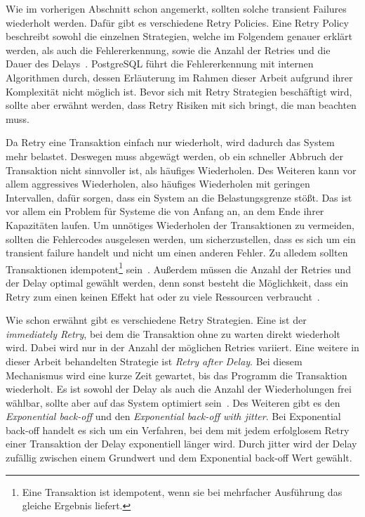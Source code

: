 
Wie im vorherigen Abschnitt schon angemerkt, sollten solche transient Failures wiederholt werden.
Dafür gibt es verschiedene Retry Policies.
Eine Retry Policy beschreibt sowohl die einzelnen Strategien, welche im Folgendem genauer erklärt werden, als auch
die Fehlererkennung, sowie die Anzahl der Retries und die Dauer des Delays~\cite{MicrosoftTransientFaults}.
PostgreSQL führt die Fehlererkennung mit internen Algorithmen durch, dessen Erläuterung im Rahmen dieser Arbeit
aufgrund ihrer Komplexität nicht möglich ist.
Bevor sich mit Retry Strategien beschäftigt wird, sollte aber erwähnt werden, dass Retry Risiken mit sich bringt, die
man beachten muss.

Da Retry eine Transaktion einfach nur wiederholt, wird dadurch das System mehr belastet.
Deswegen muss abgewägt werden, ob ein schneller Abbruch der Transaktion nicht sinnvoller ist, als häufiges Wiederholen.
Des Weiteren kann vor allem aggressives Wiederholen, also häufiges Wiederholen mit geringen Intervallen, dafür
sorgen, dass ein System an die Belastungsgrenze stößt.
Das ist vor allem ein Problem für Systeme die von Anfang an, an dem Ende ihrer Kapazitäten laufen.
Um unnötiges Wiederholen der Transaktionen zu vermeiden, sollten die Fehlercodes ausgelesen werden, um 
sicherzustellen, dass es sich um ein transient failure handelt und nicht um einen anderen Fehler.
Zu alledem sollten Transaktionen idempotent\footnote{Eine Transaktion ist idempotent, wenn sie bei mehrfacher Ausführung
	das gleiche Ergebnis liefert.} sein~\cite{MicrosoftRetryPattern}.
Außerdem müssen die Anzahl der Retries und der Delay optimal gewählt werden, denn sonst besteht die Möglichkeit,
dass ein Retry zum einen keinen Effekt hat oder zu viele Ressourcen verbraucht~\cite{MicrosoftTransientFaults}.

Wie schon erwähnt gibt es verschiedene Retry Strategien.
Eine ist der \emph{immediately Retry}, bei dem die Transaktion ohne zu warten direkt wiederholt wird.
Dabei wird nur in der Anzahl der möglichen Retries variiert.
Eine weitere in dieser Arbeit behandelten Strategie ist \emph{Retry after Delay}.
Bei diesem Mechanismus wird eine kurze Zeit gewartet, bis das Programm die Transaktion wiederholt.
Es ist sowohl der Delay als auch die Anzahl der Wiederholungen frei wählbar, sollte aber auf das System optimiert
sein~\cite{MicrosoftRetryPattern}.
Des Weiteren gibt es den \emph{Exponential back-off} und den \emph{Exponential back-off with jitter}.
Bei Exponential back-off handelt es sich um ein Verfahren, bei dem mit jedem erfolglosem Retry einer Transaktion der
Delay exponentiell länger wird.
Durch jitter wird der Delay zufällig zwischen einem Grundwert und dem Exponential back-off Wert gewählt.

